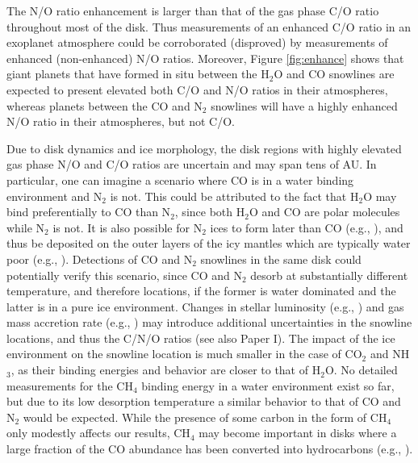 \documentclass[apj]{emulateapj}
\begin{document}
The N/O ratio enhancement is larger than that of the gas phase C/O ratio throughout most of the disk. Thus measurements of an enhanced C/O ratio in an exoplanet atmosphere could be corroborated (disproved) by measurements of enhanced (non-enhanced) N/O ratios. Moreover, Figure \ref{fig:enhance} shows that giant planets that have formed in situ between the H$_2$O and CO snowlines are expected to present elevated both C/O and N/O ratios in their atmospheres, whereas planets between the CO and N$_2$ snowlines will have a highly enhanced N/O ratio in their atmospheres, but not C/O.  

Due to disk dynamics and ice morphology, the disk regions with highly elevated gas phase N/O and C/O ratios are uncertain and may span tens of AU. In particular, one can imagine a scenario where CO is in a water binding environment and N$_2$ is not. This could be attributed to the fact that H$_2$O may bind preferentially to CO than N$_2$, since both H$_2$O and CO are polar molecules while N$_2$ is not. It is also possible for N$_2$ ices to form later than CO (e.g., \citealt{pagani12}), and thus be deposited on the outer layers of the icy mantles which are typically water poor (e.g., \citealt{garrod11}). Detections of CO and N$_2$ snowlines in the same disk could potentially verify this scenario, since CO and N$_2$ desorb at substantially different temperature, and therefore locations, if the former is water dominated and the latter is in a pure ice environment. Changes in stellar luminosity (e.g., \citealt{kennedy06}) and gas mass accretion rate (e.g., \citealt{chambers09}) may introduce additional uncertainties in the snowline locations, and thus the C/N/O ratios (see also Paper I). The impact of the ice environment on the snowline location is much smaller in the case of CO$_2$ and NH$_3$, as their binding energies and behavior are closer to that of H$_2$O. No detailed measurements for the CH$_4$ binding energy in a water environment exist so far, but due to its low desorption temperature a similar behavior to that of CO and N$_2$ would be expected. While the presence of some carbon in the form of CH$_4$ only modestly affects our results, CH$_4$ may become important in disks where a large fraction of the CO abundance has been converted into hydrocarbons (e.g., \citealt{du15}).  %
\end{document}
